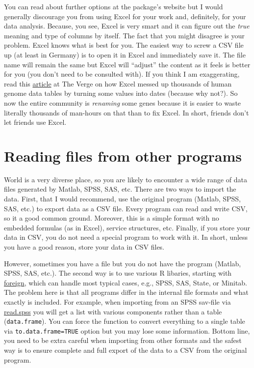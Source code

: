 \documentclass[
]{book}
\begin{document}
You can read about further options at the package's website but I would generally discourage you from using Excel for your work and, definitely, for your data analysis. Because, you see, Excel is very smart and it can figure out the \emph{true} meaning and type of columns by itself. The fact that you might disagree is your problem. Excel knows what is best for you. The easiest way to screw a CSV file up (at least in Germany) is to open it in Excel and immediately save it. The file name will remain the same but Excel will ``adjust'' the content as it feels is better for you (you don't need to be consulted with). If you think I am exaggerating, read this \href{https://www.theverge.com/2020/8/6/21355674/human-genes-rename-microsoft-excel-misreading-dates}{article} at The Verge on how Excel messed up thousands of human genome data tables by turning some values into dates (because why not?). So now the entire community is \emph{renaming} some genes because it is easier to waste literally thousands of man-hours on that than to fix Excel. In short, friends don't let friends use Excel.

\hypertarget{reading-files-from-other-programs}{%
\section{Reading files from other programs}\label{reading-files-from-other-programs}}

World is a very diverse place, so you are likely to encounter a wide range of data files generated by Matlab, SPSS, SAS, etc. There are two ways to import the data. First, that I would recommend, use the original program (Matlab, SPSS, SAS, etc.) to export data as a CSV file. Every program can read and write CSV, so it a good common ground. Moreover, this is a simple format with no embedded formulas (as in Excel), service structures, etc. Finally, if you store your data in CSV, you do not need a special program to work with it. In short, unless you have a good reason, store your data in CSV files.

However, sometimes you have a file but you do not have the program (Matlab, SPSS, SAS, etc.). The second way is to use various R libaries, starting with \href{https://www.rdocumentation.org/packages/foreign}{foreign}, which can handle most typical cases, e.g., SPSS, SAS, State, or Minitab. The problem here is that all programs differ in the internal file formats and what exactly is included. For example, when importing from an SPSS sav-file via \href{https://www.rdocumentation.org/packages/foreign/versions/0.8-80/topics/read.spss}{read.spss} you will get a list with various components rather than a table (\texttt{data.frame}). You can force the function to convert everything to a single table via \texttt{to.data.frame=TRUE} option but you may lose some information. Bottom line, you need to be extra careful when importing from other formats and the safest way is to ensure complete and full export of the data to a CSV from the original program.
\end{document}
